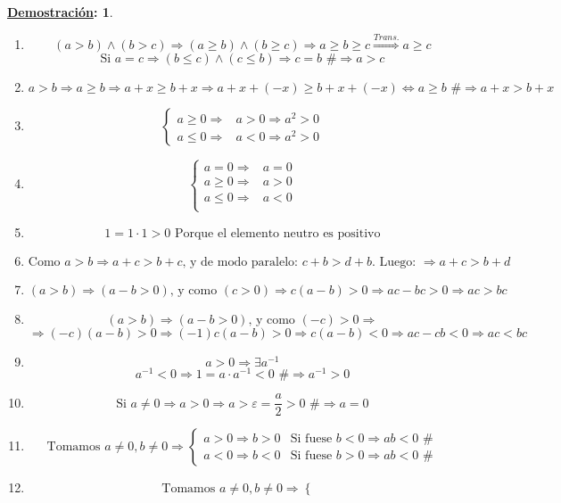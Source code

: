 \documentclass[10pt,a4paper,openright]{book}
\theoremstyle{break}
\newtheorem*{demo}{\underline{Demostración}:}
\begin{document}
\begin{demo}
\begin{enumerate}
\item $$(a>b)\wedge (b>c)\Rightarrow (a\geq b)\wedge (b\geq c)\Rightarrow a\geq b \geq c\stackrel{Trans.}{\Rightarrow} a\geq c$$
$$\mbox{Si } a=c\Rightarrow (b\leq c) \wedge (c\leq b)\Rightarrow c=b\mbox{ \#}\Rightarrow a>c$$
\item $$a>b\Rightarrow a\geq b \Rightarrow a+x\geq b+x \Rightarrow a+x+(-x)\geq b+x+(-x)\Leftrightarrow a\geq b \mbox{ \#}\Rightarrow a+x>b+x$$
\item $$\begin{cases}
a\geq 0 \Rightarrow & a>0\Rightarrow a^2>0 \\
a\leq 0 \Rightarrow & a<0 \Rightarrow a^2>0
\end{cases}$$
\item $$\begin{cases}
a=0\Rightarrow & a=0 \\
a\geq 0 \Rightarrow & a>0 \\
a\leq 0 \Rightarrow & a<0 \\
\end{cases}$$
\item $$1=1\cdot 1>0 \mbox{ Porque el elemento neutro es positivo}$$
\item $$\mbox{Como } a>b\Rightarrow a+c>b+c\mbox{, y de modo paralelo: } c+b>d+b\mbox{. Luego: }\Rightarrow a+c>b+d$$
\item $$(a>b)\Rightarrow (a-b>0)\mbox{, y como } (c>0)\Rightarrow c(a-b)>0 \Rightarrow ac-bc>0\Rightarrow ac>bc$$
\item $$(a>b)\Rightarrow (a-b>0)\mbox{, y como }(-c)>0 \Rightarrow $$
$$\Rightarrow (-c)(a-b)>0 \Rightarrow (-1)c(a-b)>0\Rightarrow c(a-b)<0\Rightarrow ac-cb<0\Rightarrow ac<bc$$
\item $$a>0\Rightarrow \exists a^{-1}$$
$$a^{-1}<0\Rightarrow 1=a\cdot a^{-1}<0 \mbox{ \#}\Rightarrow a^{-1}>0$$
\item $$\mbox{Si }a\neq 0\Rightarrow a>0\Rightarrow a>\varepsilon=\frac{a}{2}>0\mbox{ \#}\Rightarrow a=0$$
\item $$\mbox{Tomamos }a\neq 0, b\neq 0\Rightarrow 
\begin{cases}
a>0 \Rightarrow b>0 & \mbox{Si fuese } b<0\Rightarrow ab<0 \mbox{ \#}\\
a<0 \Rightarrow b<0 & \mbox{Si fuese } b>0\Rightarrow ab<0 \mbox{ \#}
\end{cases}
$$
\item $$\mbox{Tomamos }a\neq 0, b\neq 0\Rightarrow 
\begin{cases}

\end{cases}$$
\end{enumerate}
\end{demo}
\end{document}
